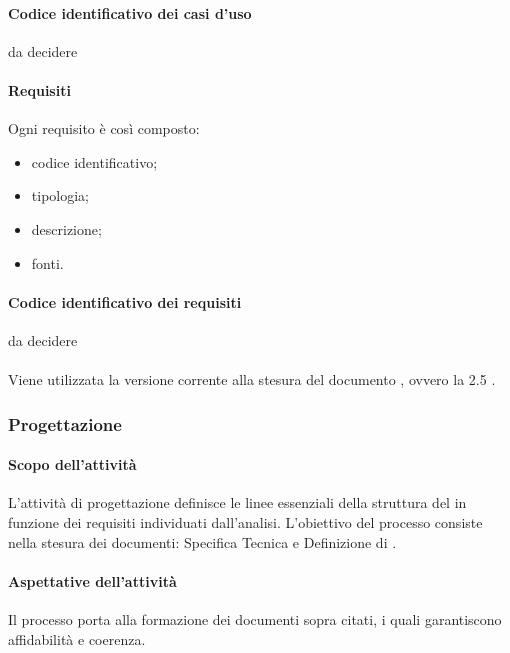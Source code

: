  \paragraph{Codice identificativo dei casi d'uso}
da decidere
 \paragraph{Requisiti}
 Ogni requisito è così composto:
  \begin{itemize}
  \item codice identificativo;
  \item tipologia;
  \item descrizione;
  \item fonti.
 \end{itemize}
 \paragraph{Codice identificativo dei requisiti}
 da decidere
 \paragraph{}
 Viene utilizzata la versione corrente alla stesura del documento , ovvero la 2.5 .

\subsubsection{Progettazione}
 \paragraph{Scopo dell'attività}
L'attività di progettazione definisce le linee essenziali della struttura del   in
funzione dei requisiti individuati dall'analisi. L'obiettivo del processo consiste nella stesura dei
documenti: Specifica Tecnica e Definizione di .
 \paragraph{Aspettative dell'attività}
Il processo porta alla formazione dei documenti sopra citati, i quali garantiscono affidabilità e
coerenza.
